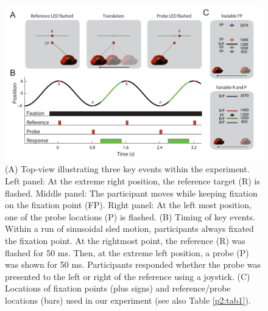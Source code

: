 \begin{figure}
	\includegraphics[width=1.0\textwidth]{src/paper2/figure1.pdf}
	
	\caption{(A) Top-view illustrating three key events within the experiment. Left panel: At the extreme right position, the reference target (R) is flashed. Middle panel: The participant moves while keeping fixation on the fixation point (FP). Right panel: At the left most position, one of the probe locations (P) is flashed. (B) Timing of key events. Within a run of sinusoidal sled motion, participants always fixated the fixation point. At the rightmost point, the reference (R) was flashed for 50 ms. Then, at the extreme left position, a probe (P) was shown for 50 ms. Participants responded whether the probe was presented to the left or right of the reference using a joystick. (C) Locations of fixation points (plus signs) and reference/probe locations (bars) used in our experiment (see also Table \ref{p2:tab1}).}
	
	\label{p2:fig1}
\end{figure}

